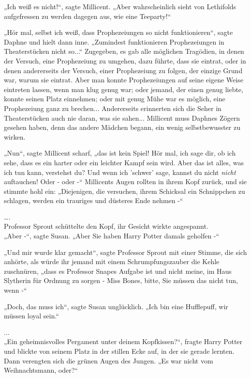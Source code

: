 {„Ich weiß es nicht!“, sagte Millicent. „Aber wahrscheinlich sieht von Lethifolds aufgefressen zu werden dagegen aus, wie eine Teeparty!“

„Hör mal, selbst ich weiß, dass Prophezeiungen so nicht funktionieren“, sagte Daphne und hielt dann inne. „Zumindest funktionieren Prophezeiungen in Theaterstücken nicht so...“ Zugegeben, es gab alle möglichen Tragödien, in denen der Versuch, eine Prophezeiung zu umgehen, dazu führte, dass sie eintrat, oder in denen andererseits der Versuch, einer Prophezeiung zu folgen, der einzige Grund war, warum sie eintrat. Aber man konnte Prophezeiungen auf seine eigene Weise eintreten lassen, wenn man klug genug war; oder jemand, der einen genug liebte, konnte seinen Platz einnehmen; oder mit genug Mühe war es möglich, eine Prophezeiung ganz zu brechen... Andererseits erinnerten sich die Seher in Theaterstücken auch nie daran, was sie sahen... Millicent muss Daphnes Zögern gesehen haben, denn das andere Mädchen begann, ein wenig selbstbewusster zu wirken.

„Nun“, sagte Millicent scharf, „das ist kein Spiel! Hör mal, ich sage dir, ob ich sehe, dass es ein harter oder ein leichter Kampf sein wird. Aber das ist alles, was ich tun kann, verstehst du? Und wenn ich 'schwer' sage, kannst du nicht \emph{nicht} auftauchen! Oder - oder -“ Millicents Augen rollten in ihrem Kopf zurück, und sie stimmte hohl ein: „Diejenigen, die versuchen, ihrem Schicksal ein Schnippchen zu schlagen, werden ein trauriges und düsteres Ende nehmen -“

….\\ Professor Sprout schüttelte den Kopf, ihr Gesicht wirkte angespannt.\\ „Aber -“, sagte Susan. „Aber Sie haben Harry Potter damals geholfen -“

„Und mir wurde klar gemacht“, sagte Professor Sprout mit einer Stimme, die sich anhörte, als würde ihr jemand mit einem Schrumpfungszauber die Kehle zuschnüren, „dass es Professor Snapes Aufgabe ist und nicht meine, im Haus Slytherin für Ordnung zu sorgen - Miss Bones, bitte, Sie müssen das nicht tun, wenn -“

„Doch, das muss ich“, sagte Susan unglücklich. „Ich bin eine Hufflepuff, wir müssen loyal sein.“

...\\ „Ein geheimnisvolles Pergament unter deinem Kopfkissen?“, fragte Harry Potter und blickte von seinem Platz in der stillen Ecke auf, in der sie gerade lernten. Dann verengten sich die grünen Augen des Jungen. „Es war nicht vom Weihnachtsmann, oder?“

}
